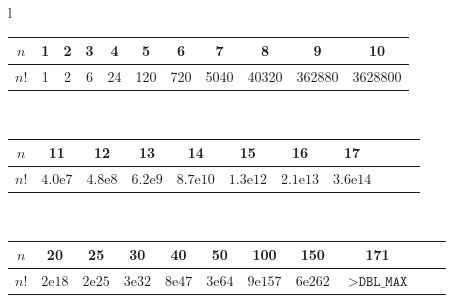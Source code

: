 \begin{center}
\begin{tabular}{l}
\begin{tabular}{c|c@{\ }c@{\ }c@{\ }c@{\ }c@{\ }c@{\ }c@{\ }c@{\ }c@{\ }c}
$n$  & 1 & 2 & 3 & 4  & 5   & 6   & 7    & 8     & 9      & 10\\
\hline
$n!$ & 1 & 2 & 6 & 24 & 120 & 720 & 5040 & 40320 & 362880 & 3628800\\
\end{tabular}\\
\begin{tabular}{c|c@{\ }c@{\ }c@{\ }c@{\ }c@{\ }c@{\ }c@{\ }c@{\ }c@{\ }c}
$n$  & 11    & 12    & 13    & 14     & 15     & 16     & 17\\
\hline
$n!$ & $4.0\mathrm{e}7$ & $4.8\mathrm{e}8$ & $6.2\mathrm{e}9$ & $8.7\mathrm{e}10$ & $1.3\mathrm{e}12$ & $2.1\mathrm{e}13$ & $3.6\mathrm{e}14$\\
\end{tabular}\\
\begin{tabular}{c|c@{\ }c@{\ }c@{\ }c@{\ }c@{\ }c@{\ }c@{\ }c@{\ }c@{\ }c}
$n$  & 20   & 25   & 30   & 40   & 50   & 100   & 150   & 171\\
\hline
$n!$ & $2\mathrm{e}18$ & $2\mathrm{e}25$ & $3\mathrm{e}32$ & $8\mathrm{e}47$ & $3\mathrm{e}64$ & $9\mathrm{e}157$ & $6\mathrm{e}262$ & \scriptsize{$>\texttt{DBL\_MAX}$}\\
\end{tabular}
\end{tabular}
\end{center}
